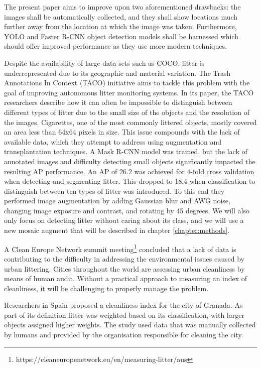 \documentclass{thesis}
\begin{document}
The present paper aims to improve upon two aforementioned drawbacks: the images shall be automatically collected, and they shall show locations much further away from the location at which the image was taken. Furthermore, YOLO and Faster R-CNN object detection models shall be harnessed which should offer improved performance as they use more modern techniques.

Despite the availability of large data sets such as COCO\cite{lin2015microsoft}, litter is underrepresented due to its geographic and material variation. The Trash Annotations In Context (TACO) initiative aims to tackle this problem with the goal of improving autonomous litter monitoring systems\cite{DBLP:journals/corr/abs-2003-06975}. In its paper, the TACO researchers describe how it can often be impossible to distinguish between different types of litter due to the small size of the objects and the resolution of the images. Cigarettes, one of the most commonly littered objects, mostly covered an area less than 64x64 pixels in size. This issue compounds with the lack of available data, which they attempt to address using augmentation and transplantation techniques. A Mask R-CNN model was trained, but the lack of annotated images and difficulty detecting small objects significantly impacted the resulting AP performance. An AP of 26.2 was achieved for 4-fold cross validation when detecting and segmenting litter. This dropped to 18.4 when classification to distinguish between ten types of litter was introduced. To this end they performed image augmentation by adding Gaussian blur and AWG noise, changing image
exposure and contrast, and rotating by 45 degrees. We will also only focus on detecting litter without caring about its class, and we will use a new mosaic augment that will be described in chapter \ref{chapter:methods}.

A Clean Europe Network summit meeting\footnote{https://cleaneuropenetwork.eu/en/measuring-litter/aus} concluded that a lack of data is contributing to the difficulty in addressing the environmental issues caused by urban littering. Cities throughout the world are assessing urban cleanliness by means of human audit. Without a practical approach to measuring an index of cleanliness, it will be challenging to properly manage the problem. 

Researchers in Spain proposed a cleanliness index for the city of Granada\cite{sevilla}. As part of its definition litter was weighted based on its classification, with larger objects assigned higher weights. The study used data that was manually collected by humans and provided by the organisation responsible for cleaning the city.
\end{document}
